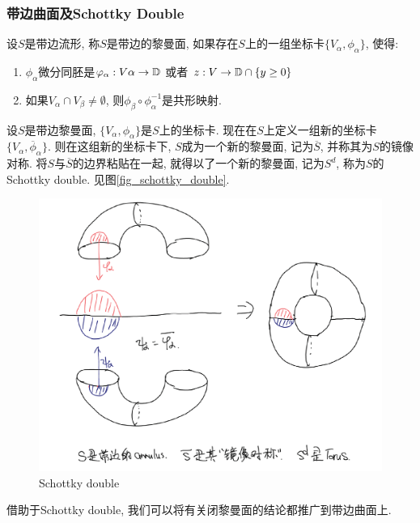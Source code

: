 \subsubsection{带边曲面及Schottky Double}
\begin{definition}
    设$S$是带边流形, 称$S$是带边的黎曼面, 如果存在$S$上的一组坐标卡$\{V_\alpha, \phi_\alpha\}$, 使得:
    \begin{enumerate}
        \item $\phi_\alpha$微分同胚是${\varphi}_\alpha: V\alpha \to {\mathbb{D}}$ 或者 $z: V \to {\mathbb{D}} \cap \{y\ge 0\}$
        \item 如果$V_\alpha \cap V_\beta \ne \emptyset$, 则$\phi_\beta \circ \phi_\alpha^{-1}$是共形映射.
    \end{enumerate}
\end{definition}
\begin{definition}
    设$S$是带边黎曼面, $\{V_\alpha, \phi_\alpha\}$是$S$上的坐标卡. 现在在$S$上定义一组新的坐标卡$\{V_\alpha, \overline{\phi}_\alpha\}$. 则在这组新的坐标卡下, $S$成为一个新的黎曼面, 记为$\overline{S}$, 并称其为$S$的镜像对称.  将$S$与$\overline{S}$的边界粘贴在一起, 就得以了一个新的黎曼面, 记为$S^d$, 称为$S$的Schottky double. 见图\eqref{fig_schottky_double}.
\end{definition}
\begin{figure}[!h]
    \centering
    \includegraphics[scale=0.5]{images/schottky_double.png}
    \caption{Schottky double}
    \label{fig_schottky_double}
\end{figure}
借助于Schottky double, 我们可以将有关闭黎曼面的结论都推广到带边曲面上.
